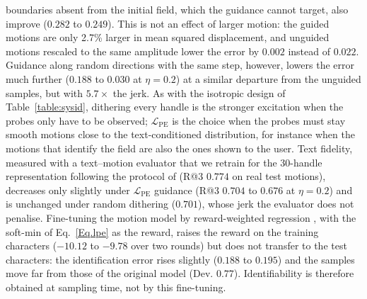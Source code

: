 \documentclass[lettersize,journal]{IEEEtran}
\newenvironment{revblock}{\par\color{red}}{\par}
\begin{document}
\begin{revblock}
boundaries absent from the initial field, which the guidance cannot target, also improve
($0.282$ to $0.249$). This is not an effect of larger motion: the guided motions are only 2.7\%
larger in mean squared displacement, and unguided motions rescaled to the same amplitude lower
the error by $0.002$ instead of $0.022$. Guidance along random directions with the same step,
however, lowers the error much further ($0.188$ to $0.030$ at $\eta=0.2$) at a similar
departure from the unguided samples, but with $5.7\times$ the jerk. As with the isotropic design
of Table~\ref{table:sysid}, dithering every handle is the stronger excitation when the probes
only have to be observed; $\mathcal{L}_{\text{PE}}$ is the choice when the probes must stay
smooth motions close to the text-conditioned distribution, for instance when the motions that
identify the field are also the ones shown to the user. Text fidelity, measured with a
text--motion evaluator that we retrain for the 30-handle representation following the protocol
of \cite{guo2022generating} (R@3 $0.774$ on real test motions), decreases only slightly under
$\mathcal{L}_{\text{PE}}$ guidance (R@3 $0.704$ to $0.676$ at $\eta=0.2$) and is unchanged under
random dithering ($0.701$), whose jerk the evaluator does not penalise. Fine-tuning the motion
model by reward-weighted regression \cite{peters2007reinforcement}, with the soft-min of
Eq.~\ref{Eq.lpe} as the reward, raises the reward on the training characters ($-10.12$ to
$-9.78$ over two rounds) but does not transfer to the test characters: the identification error
rises slightly ($0.188$ to $0.195$) and the samples move far from those of the original model
(Dev. $0.77$). Identifiability is therefore obtained at sampling time, not by this fine-tuning.
\end{revblock}
\end{document}
